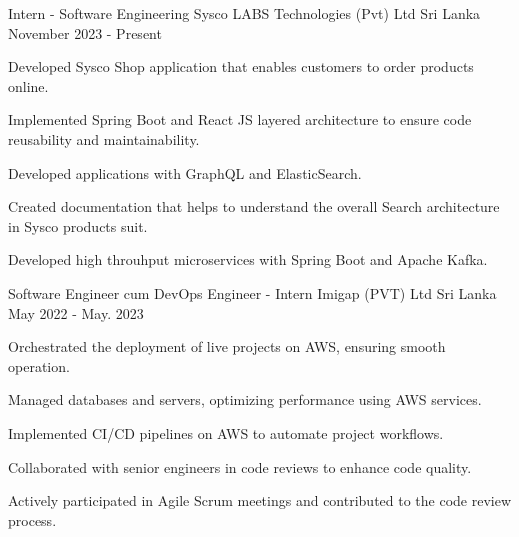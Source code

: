 

\begin{cventries}

  \cventry
  {Intern - Software Engineering} %
  {Sysco LABS Technologies (Pvt) Ltd} %
  {Sri Lanka} %
  {November 2023 - Present} %
  {
    \begin{cvitems} %
      \item {Developed Sysco Shop application that enables customers to order products online.}
      \item {Implemented Spring Boot and React JS layered architecture to ensure code reusability and maintainability.}
      \item {Developed applications with GraphQL and ElasticSearch.}
      \item {Created documentation that helps to understand the overall Search architecture in Sysco products suit.}
      \item {Developed high throuhput microservices with Spring Boot and Apache Kafka.}
    \end{cvitems}
  }

  \cventry
  {Software Engineer cum DevOps Engineer - Intern} %
  {Imigap (PVT) Ltd} %
  {Sri Lanka} %
  {May 2022 - May. 2023} %
  {
    \begin{cvitems} %
      \item {Orchestrated the deployment of live projects on AWS, ensuring smooth operation.}
      \item {Managed databases and servers, optimizing performance using AWS services.}
      \item {Implemented CI/CD pipelines on AWS to automate project workflows.}
      \item {Collaborated with senior engineers in code reviews to enhance code quality.}
      \item {Actively participated in Agile Scrum meetings and contributed to the code review process.}
    \end{cvitems}
  }


\end{cventries}
